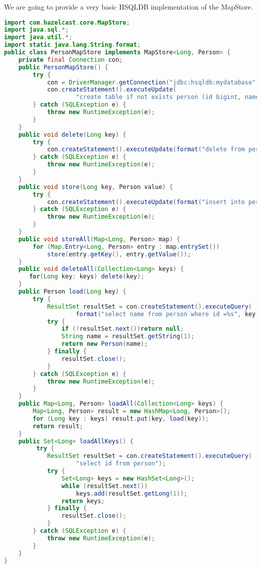 We are going to provide a very basic HSQLDB implementation of the MapStore.
\begin{lstlisting}[language=java]
import com.hazelcast.core.MapStore;
import java.sql.*;
import java.util.*;
import static java.lang.String.format;
public class PersonMapStore implements MapStore<Long, Person> {
    private final Connection con;
    public PersonMapStore() {
        try {
            con = DriverManager.getConnection("jdbc:hsqldb:mydatabase", "SA", "");
            con.createStatement().executeUpdate(
                    "create table if not exists person (id bigint, name varchar(45))");
        } catch (SQLException e) {
            throw new RuntimeException(e);
        }
    }
    public void delete(Long key) {
        try {
            con.createStatement().executeUpdate(format("delete from person where id = %s", key));
        } catch (SQLException e) {
            throw new RuntimeException(e);
        }
    }
    public void store(Long key, Person value) {
        try {
            con.createStatement().executeUpdate(format("insert into person values(%s,'%s')", key, value.name));
        } catch (SQLException e) {
            throw new RuntimeException(e);
        }
    }
    public void storeAll(Map<Long, Person> map) {
        for (Map.Entry<Long, Person> entry : map.entrySet())
            store(entry.getKey(), entry.getValue());
    }
    public void deleteAll(Collection<Long> keys) {
       for(Long key: keys) delete(key);
    }
    public Person load(Long key) {
        try {
            ResultSet resultSet = con.createStatement().executeQuery(
                    format("select name from person where id =%s", key));
            try {
                if (!resultSet.next())return null;
                String name = resultSet.getString(1);
                return new Person(name);
            } finally {
                resultSet.close();
            }
        } catch (SQLException e) {
            throw new RuntimeException(e);
        }
    }
    public Map<Long, Person> loadAll(Collection<Long> keys) {
        Map<Long, Person> result = new HashMap<Long, Person>();
        for (Long key : keys) result.put(key, load(key));
        return result;
    }
    public Set<Long> loadAllKeys() {
         try {
            ResultSet resultSet = con.createStatement().executeQuery(
                    "select id from person");
            try {
                Set<Long> keys = new HashSet<Long>();
                while (resultSet.next())
                    keys.add(resultSet.getLong(1));
                return keys;
            } finally {
                resultSet.close();
            }
        } catch (SQLException e) {
            throw new RuntimeException(e);
        }
    }
}
\end{lstlisting}

